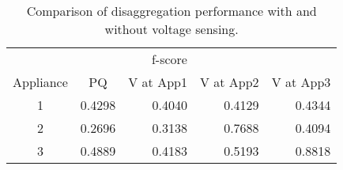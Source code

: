 \begin{table}[htb]
	\centering
	\caption{Comparison of disaggregation performance with and without voltage sensing.}
	\begin{tabular}{@{}ccrrr@{}}
		 &  & f-score \\
		Appliance  &  PQ  &  V at App1  &  V at App2  &  V at App3 \\
	\midrule
		1  &  0.4298  &  0.4040  &  0.4129  &  0.4344 \\
		2  &  0.2696  &  0.3138  &  0.7688  &  0.4094 \\
		3  &  0.4889  &  0.4183  &  0.5193  &  0.8818 \\
	\bottomrule
	\end{tabular}
	\label{tab:voltageResult}
\end{table}
